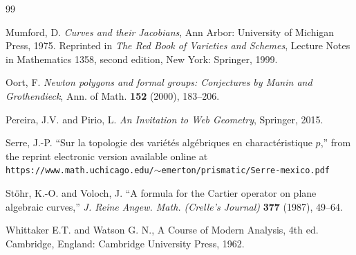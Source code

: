 \documentclass[12pt]{amsart}
\theoremstyle{theorem}
\begin{document}
\begin{thebibliography}{99}

 Mumford, D.  {\it Curves and their Jacobians}, Ann Arbor: University of Michigan Press, 1975.  Reprinted in {\it The
Red Book of Varieties and Schemes}, Lecture Notes in Mathematics 1358, second edition, New York: Springer, 1999.

  Oort, F.  {\it Newton polygons and formal groups: Conjectures by Manin and Grothendieck}, Ann. of Math.  {\bf 152} (2000), 183--206.

  Pereira, J.V.  and Pirio, L.  {\it An Invitation to Web Geometry}, Springer, 2015.

  Serre, J.-P.  ``Sur la topologie des vari\'et\'es alg\'ebriques en charact\'eristique $p$,'' from the reprint electronic version available online at
{\tt https://www.math.uchicago.edu/$\sim$emerton/prismatic/Serre-mexico.pdf}

  St\"ohr, K.-O. and Voloch, J.  ``A formula for the Cartier operator on plane algebraic curves,''
{\it J. Reine Angew. Math. (Crelle's Journal)} {\bf 377} (1987), 49--64.

 Whittaker E.T.  and Watson G. N., A Course of Modern Analysis, 4th ed. Cambridge, England: Cambridge University Press, 1962.

\end{thebibliography}
\end{document}
